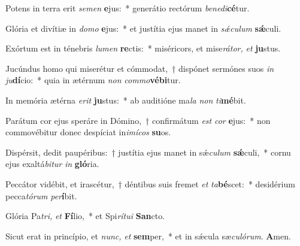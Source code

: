 \item Potens in terra erit \textit{semen} \textbf{e}jus:~* generátio rectórum \textit{benedi}\textbf{cé}tur.
\item Glória et divítiæ in \textit{domo} \textbf{e}jus:~* et justítia ejus manet in \textit{sǽculum} \textbf{sǽ}culi.
\item Exórtum est in ténebris \textit{lumen} \textbf{re}ctis:~* miséricors, et mise\textit{rátor,} \textit{et} \textbf{ju}stus.
\item Jucúndus homo qui miserétur et cómmodat,~† dispónet sermónes suos \textit{in} \textit{ju}\textbf{dí}cio:~* quia in ætérnum \textit{non} \textit{commo}\textbf{vébi}tur.
\item In memória ætérna \textit{erit} \textbf{ju}stus:~* ab auditióne ma\hspace*{0.03em}\textit{la} \textit{non} \textit{ti}\textbf{mé}bit.
\item Parátum cor ejus speráre in Dómino,~† confirmátum \textit{est} \textit{cor} \textbf{e}jus:~* non commovébitur donec despíciat in\textit{imícos} \textbf{su}os.
\item Dispérsit, dedit paupéribus:~† justítia ejus manet in sǽ\hspace*{0.03em}\textit{culum} \textbf{sǽ}culi,~* cornu ejus exaltá\hspace*{0.03em}\textit{bitur} \textit{in} \textbf{gló}ria.
\item Peccátor vidébit, et irascétur,~† déntibus suis fremet \textit{et} \textit{ta}\textbf{bé}scet:~* desidérium pecca\hspace*{0.03em}\textit{tórum} \textit{per}\textbf{í}bit.
\item Glória Pa\hspace{0.04em}\textit{tri,} \textit{et} \textbf{Fí}lio,~* et Spi\textit{rítui} \textbf{San}cto.
\item Sicut erat in princípio, et \textit{nunc,} \textit{et} \textbf{sem}per,~* et in sǽcula sæ\hspace*{0.03em}\textit{culórum}. \textbf{A}men.
